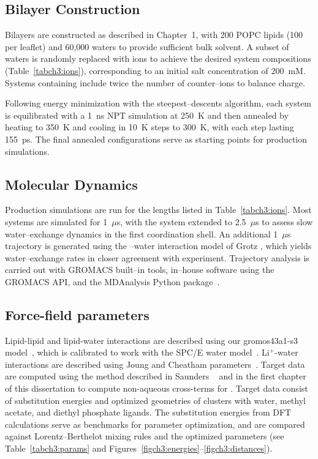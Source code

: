 \subsection{Bilayer Construction}
Bilayers are constructed as described in Chapter~1, with 200 POPC lipids
(100 per leaflet) and 60,000 waters to provide sufficient bulk solvent.
A subset of waters is randomly replaced with ions to achieve the desired
system compositions (Table~\ref{tabch3:ions}), corresponding to an initial
salt concentration of 200~mM. Systems containing \mg include twice the
number of counter--ions to balance charge.

Following energy minimization with the steepest--descents algorithm,
each system is equilibrated with a 1~ns NPT simulation at 250~K and then
annealed by heating to 350~K and cooling in 10~K steps to 300~K, with each
step lasting 155~ps. The final annealed configurations serve as starting
points for production simulations.

\subsection{Molecular Dynamics}

Production simulations are run for the lengths listed in
Table~\ref{tabch3:ions}. Most systems are simulated for 1~$\mu$s, with the
\mgmbnbfix system extended to 2.5~$\mu$s to assess slow water--exchange
dynamics in the first coordination shell. An additional 1~$\mu$s trajectory
is generated using the \mg--water interaction model of Grotz \etal{}
\cite{grotz:2021:optimized}, which yields water--exchange rates in closer
agreement with experiment. Trajectory analysis is carried out with
GROMACS built--in tools, in--house software using the GROMACS API, and the
MDAnalysis Python package~\cite{gromacsmanual,mdanalysis1,mdanalysis2}.

\subsection{Force-field parameters}

Lipid-lipid and lipid-water interactions are described using our 
gromos43a1-s3 model~\cite{chiu:2009}, 
which is calibrated to work with the SPC/E water model~\cite{spce}. 
Li$^+$-water interactions 
are described using Joung and Cheatham parameters~\cite{joung:2008}. 
Target data are computed using the method described in Saunders \etal~\cite{saunders:2022} and in the first chapter of this dissertation
to compute non-aqueous cross-terms for \li{}. Target data consist of substitution
energies and optimized geometries of \li{} clusters with water, methyl acetate,
and diethyl phosphate ligands. The substitution energies from DFT calculations
serve as benchmarks for parameter optimization, and are compared against
Lorentz–Berthelot mixing rules and the optimized parameters
(see Table~\ref{tabch3:params} and Figures~\ref{figch3:energies}--\ref{figch3:distances}).

